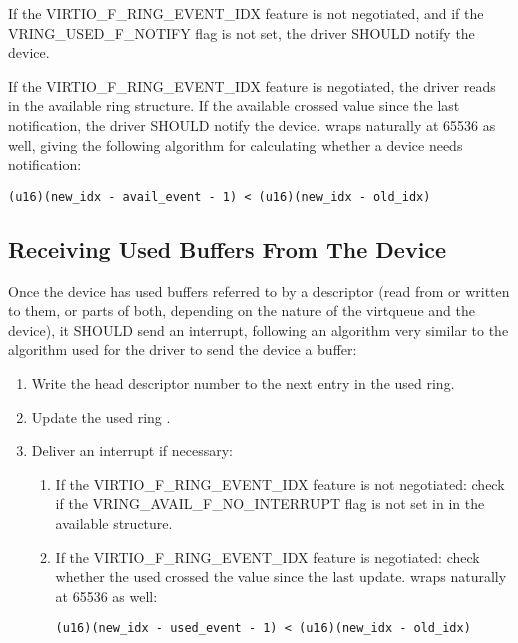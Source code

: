 If the VIRTIO_F_RING_EVENT_IDX feature is not negotiated, and if the
VRING_USED_F_NOTIFY flag is not set, the driver SHOULD notify the
device.

If the VIRTIO_F_RING_EVENT_IDX feature is negotiated, the driver reads
 in the available ring structure. If the
available  crossed  value since the
last notification, the driver SHOULD notify the device.   wraps naturally at 65536 as well,
giving the following algorithm for calculating whether a device needs
notification:

\begin{lstlisting}
(u16)(new_idx - avail_event - 1) < (u16)(new_idx - old_idx)
\end{lstlisting}

\subsection{Receiving Used Buffers From The Device}\label{sec:General Initialization And Device Operation / Device Operation / Receiving Used Buffers From The Device}

Once the device has used buffers referred to by a descriptor (read from or written to them, or
parts of both, depending on the nature of the virtqueue and the
device), it SHOULD send an interrupt, following an algorithm very
similar to the algorithm used for the driver to send the device a
buffer:

\begin{enumerate}
\item Write the head descriptor number to the next entry in the used
  ring.

\item Update the used ring .

\item Deliver an interrupt if necessary:

  \begin{enumerate}
  \item If the VIRTIO_F_RING_EVENT_IDX feature is not negotiated:
    check if the VRING_AVAIL_F_NO_INTERRUPT flag is not set in
     in the available structure.

  \item If the VIRTIO_F_RING_EVENT_IDX feature is negotiated: check
    whether the used  crossed the  value
    since the last update.  wraps naturally
    at 65536 as well:
\begin{lstlisting}
(u16)(new_idx - used_event - 1) < (u16)(new_idx - old_idx)
\end{lstlisting}
  \end{enumerate}
\end{enumerate}

